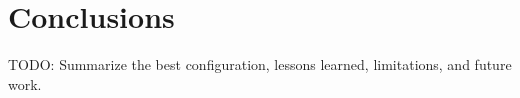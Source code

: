 \section{Conclusions}

TODO: Summarize the best configuration, lessons learned, limitations, and future work.
